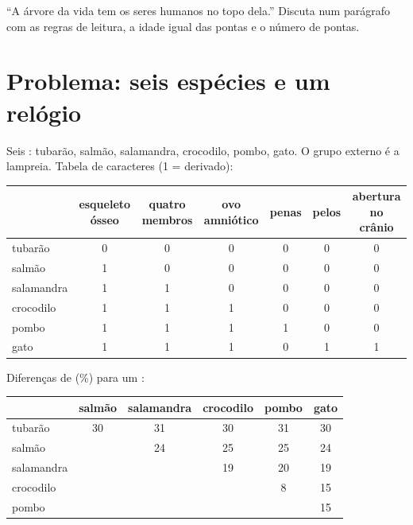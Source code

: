 \begin{exercise}[$\star\star\star$]\label{exo:g12:phylogenetic-trees:15}
``A árvore da vida tem os seres humanos no topo dela.'' Discuta num
parágrafo com as regras de leitura, a idade igual das pontas e o número
de pontas.
\end{exercise}

\section{Problema: seis espécies e um relógio}

\begin{problem}
\label{pb:g12:phylogenetic-trees:1}
Seis : tubarão, salmão, salamandra, crocodilo, pombo, gato. O
grupo externo é a lampreia. Tabela de caracteres (1 = derivado):

\begin{center}
\small
\setlength{\tabcolsep}{4.5pt}
\begin{tabular}{lcccccc}
 & esqueleto ósseo & quatro membros & ovo amniótico & penas & pelos & abertura no crânio \\ \hline
tubarão & 0 & 0 & 0 & 0 & 0 & 0 \\
salmão & 1 & 0 & 0 & 0 & 0 & 0 \\
salamandra & 1 & 1 & 0 & 0 & 0 & 0 \\
crocodilo & 1 & 1 & 1 & 0 & 0 & 0 \\
pombo & 1 & 1 & 1 & 1 & 0 & 0 \\
gato & 1 & 1 & 1 & 0 & 1 & 1 \\
\end{tabular}
\end{center}

Diferenças de  (\%) para um :

\begin{center}
\begin{tabular}{lccccc}
 & salmão & salamandra & crocodilo & pombo & gato \\ \hline
tubarão & 30 & 31 & 30 & 31 & 30 \\
salmão & & 24 & 25 & 25 & 24 \\
salamandra & & & 19 & 20 & 19 \\
crocodilo & & & & 8 & 15 \\
pombo & & & & & 15 \\
\end{tabular}
\end{center}


\end{problem}
